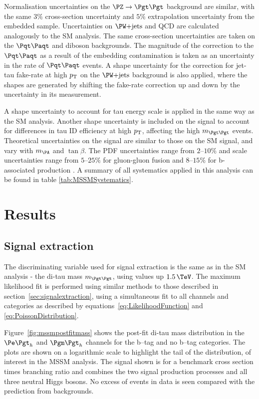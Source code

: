 Normalisation uncertainties on the $\ZToTauTau$ background are similar, with the
same $3\%$ cross-section uncertainty and $5\%$ extrapolation uncertainty from
the embedded sample. Uncertainties on $\WJets$ and QCD are calculated
analogously to the \ac{SM} analysis. The same cross-section uncertainties are taken on the $\ttbar$
and diboson backgrounds. The magnitude of the correction to the $\ttbar$ as a result 
of the embedding contamination is taken as an uncertainty in the rate of $\ttbar$ events. A shape 
uncertainty for the correction for jet-tau fake-rate at high $p_{\mathrm{T}}$ on the $\WJets$ background
is also applied, where the shapes are generated by shifting the fake-rate
correction up and down by the uncertainty in its measurement. 

A shape uncertainty to account for tau energy scale is applied in the same way
as the \ac{SM} analysis. Another shape uncertainty is included on the signal to account for differences in tau ID
efficiency at high $p_{\mathrm{T}}$, affecting the high $m_{\Pgt\Pgt}$ events. 
Theoretical uncertainties on the signal are similar to those on the \ac{SM} signal, and vary
with $m_{\PA}$ and $\tan\beta$. The \ac{PDF} uncertainties range from $2$--$10\%$ and scale uncertainties range from
$5$--$25\%$ for gluon-gluon fusion and $8$--$15\%$ for b-associated production
\cite{HIG-13-021}. A summary of all systematics applied in this analysis can be
found in table \ref{tab:MSSMSystematics}.



\section{Results}
\label{sec:mssmresults}

\subsection{Signal extraction}
\label{sec:mssmSignalExtraction}

The discriminating variable used for signal extraction is the same as in the
\ac{SM} analysis - the di-tau mass $m_{\Pgt\Pgt}$, using values up $1.5\,\TeV$.
The maximum likelihood fit is performed using similar methods to those described in 
section~\ref{sec:signalextraction}, using a simultaneous fit to all channels and
categories as described by equations~\ref{eq:LikelihoodFunction} and \ref{eq:PoissonDistribution}.

Figure~\ref{fig:mssmpostfitmass} shows the post-fit di-tau mass distribution in the
$\etau$ and $\mutau$ channels for the b--tag and no b--tag categories. The plots
are shown on a logarithmic scale to highlight the tail of the distribution, of
interest in the \ac{MSSM} analysis. The signal shown is for a benchmark cross
section times branching ratio and combines the two signal production processes
and all three neutral Higgs bosons. No excess of events in data is seen compared 
with the prediction from backgrounds.


